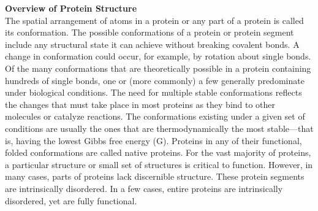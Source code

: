 \textbf{Overview of Protein Structure}\\
The spatial arrangement of atoms in a protein or any part of a protein is called its conformation. The possible conformations of a protein or protein segment include any structural state it can achieve without breaking covalent bonds. A change in conformation could occur, for example, by rotation about single bonds. Of the many conformations that are theoretically possible in a protein containing hundreds of single bonds, one or (more commonly) a few generally predominate under biological conditions. The need for multiple stable conformations reflects the changes that must take place in most proteins as they bind to other molecules or catalyze reactions. The conformations existing under a given set of conditions are usually the ones that are thermodynamically the most stable—that is, having the lowest Gibbs free energy (G). Proteins in any of their functional, folded conformations are called native proteins. For the vast majority of proteins, a particular structure or small set of structures is critical to function. However, in many cases, parts of proteins lack discernible structure. These protein segments are intrinsically disordered. In a few cases, entire proteins are intrinsically disordered, yet are fully functional. 

